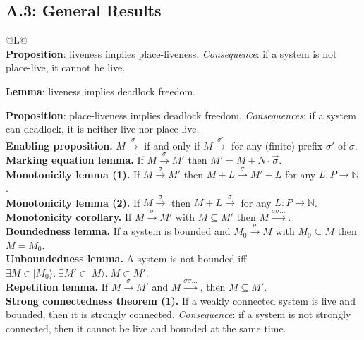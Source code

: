 \subsection*{A.3: General Results}

\begin{tabularx}{\linewidth}{@{}L@{}}
\toprule
{}  \\
\midrule
\textbf{Proposition}: liveness implies place-liveness. \emph{Consequence}: if a system is not place-live, it cannot be live. \par \textbf{Lemma}: liveness implies deadlock freedom. \par \textbf{Proposition}: place-liveness implies deadlock freedom. \emph{Consequences}: if a system can deadlock, it is neither live nor place-live. \\
\midrule
\textbf{Enabling proposition.} $M \xrightarrow{\sigma}$ if and only if $M \xrightarrow{\sigma'}$ for any (finite) prefix $\sigma'$ of $\sigma$. \\
\midrule
\textbf{Marking equation lemma.} If $M \xrightarrow{\sigma} M'$ then $M' = M + N \cdot \vec\sigma$. \\
\midrule
\textbf{Monotonicity lemma (1).} If $M \xrightarrow{\sigma} M'$ then $M + L \xrightarrow{\sigma} M' + L$ for any $L : P \to \mathbb{N}$. \\
\midrule
\textbf{Monotonicity lemma (2).} If $M \xrightarrow{\sigma}$ then $M + L \xrightarrow{\sigma}$ for any $L : P \to \mathbb{N}$. \\
\midrule
\textbf{Monotonicity corollary.} If $M \xrightarrow{\sigma} M'$ with $M \subseteq M'$ then $M \xrightarrow{\sigma\sigma\ldots}$. \\
\midrule
\textbf{Boundedness lemma.} If a system is bounded and $M_0 \xrightarrow{\sigma} M$ with $M_0 \subseteq M$ then $M = M_0$. \\
\midrule
\textbf{Unboundedness lemma.} A system is not bounded iff $\exists M \in [M_0\rangle.\; \exists M' \in [M\rangle.\; M \subset M'$. \\
\midrule
\textbf{Repetition lemma.} If $M \xrightarrow{\sigma} M'$ and $M \xrightarrow{\sigma\sigma\ldots}$, then $M \subseteq M'$. \\
\midrule
\textbf{Strong connectedness theorem (1).} If a weakly connected system is live and bounded, then it is strongly connected. \emph{Consequence}: if a system is not strongly connected, then it cannot be live and bounded at the same time. \\

\end{tabularx}
